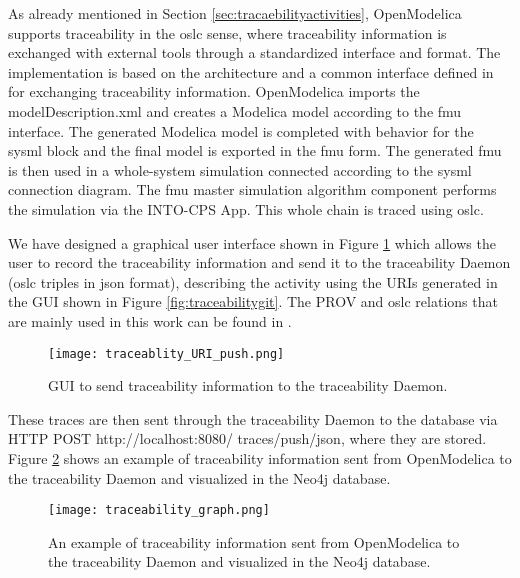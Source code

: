 As already mentioned in Section \ref{sec:tracaebilityactivities}, OpenModelica supports traceability in the \acrshort{oslc} sense, where
traceability information is exchanged with external tools through a standardized interface and format. 
The implementation is based on the architecture and a common interface defined in \cite{intocpskenneth} for 
exchanging traceability information. OpenModelica imports the modelDescription.xml and creates a Modelica model according to the \acrshort{fmu}
interface. The generated Modelica model is completed with behavior for the \acrshort{sysml} block and the final model
is exported in the \acrshort{fmu} form. The generated \acrshort{fmu} is then used in a whole-system simulation connected
according to the \acrshort{sysml} connection diagram. The \acrshort{fmu} master simulation algorithm component performs
the simulation via the INTO-CPS App. This whole chain is traced using \acrshort{oslc}.

We have designed a graphical user interface shown in Figure \ref{fig:traceabilitypush} which allows the user to record the
traceability information and send it to the traceability Daemon (\acrshort{oslc} triples in \acrshort{json} format), describing the activity
using the URIs generated in the GUI shown in Figure  \ref{fig:traceabilitygit}. The PROV and \acrshort{oslc} relations that are mainly used
in this work can be found in \cite{intocpsjohn}.

\begin{figure}
	\texttt{[image: traceablity\_URI\_push.png]}
	\caption{GUI to send traceability information to the traceability Daemon.}
	\label{fig:traceabilitypush}
\end{figure}
  
These traces are then sent through the traceability Daemon to the database via HTTP POST http://localhost:8080/
traces/push/json, where they are stored. Figure \ref{fig:traceabilitygraph} shows an example of traceability information 
sent from OpenModelica to the traceability Daemon and visualized in the Neo4j database.
\begin{landscape}
\begin{figure}
	\texttt{[image: traceability\_graph.png]}
	\caption{An example of traceability information sent from OpenModelica to the traceability Daemon and visualized in the Neo4j database.}
	\label{fig:traceabilitygraph}
\end{figure}
\end{landscape}

